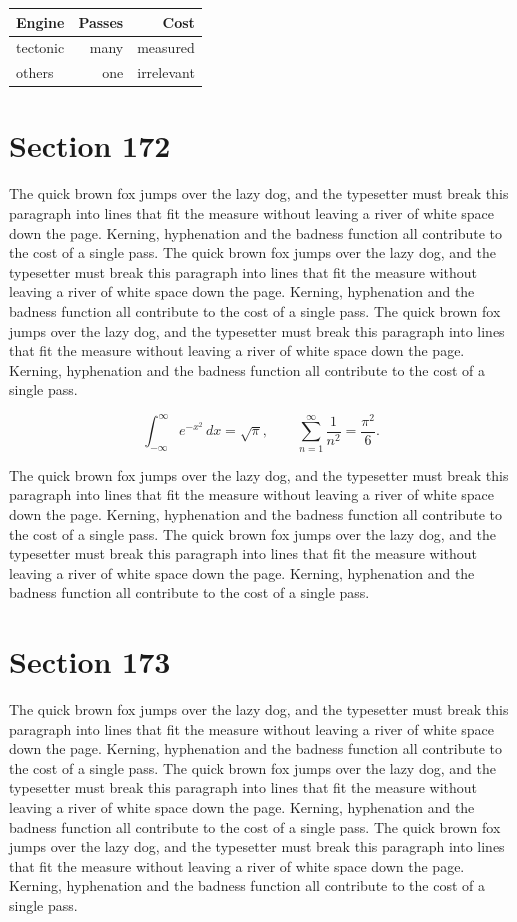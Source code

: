 \documentclass{article}
\begin{document}
\begin{center}
\begin{tabular}{lrr}
\toprule
Engine & Passes & Cost \\
\midrule
tectonic & many & measured \\
others & one & irrelevant \\
\bottomrule
\end{tabular}
\end{center}

\section{Section 172}
The quick brown fox jumps over the lazy dog, and the typesetter must break this paragraph into lines that fit the measure without leaving a river of white space down the page. Kerning, hyphenation and the badness function all contribute to the cost of a single pass. The quick brown fox jumps over the lazy dog, and the typesetter must break this paragraph into lines that fit the measure without leaving a river of white space down the page. Kerning, hyphenation and the badness function all contribute to the cost of a single pass. The quick brown fox jumps over the lazy dog, and the typesetter must break this paragraph into lines that fit the measure without leaving a river of white space down the page. Kerning, hyphenation and the badness function all contribute to the cost of a single pass. 

\begin{equation}
\int_{-\infty}^{\infty} e^{-x^{2}}\,dx = \sqrt{\pi}, \qquad
\sum_{n=1}^{\infty} \frac{1}{n^{2}} = \frac{\pi^{2}}{6}.
\end{equation}

The quick brown fox jumps over the lazy dog, and the typesetter must break this paragraph into lines that fit the measure without leaving a river of white space down the page. Kerning, hyphenation and the badness function all contribute to the cost of a single pass. The quick brown fox jumps over the lazy dog, and the typesetter must break this paragraph into lines that fit the measure without leaving a river of white space down the page. Kerning, hyphenation and the badness function all contribute to the cost of a single pass. 
\section{Section 173}
The quick brown fox jumps over the lazy dog, and the typesetter must break this paragraph into lines that fit the measure without leaving a river of white space down the page. Kerning, hyphenation and the badness function all contribute to the cost of a single pass. The quick brown fox jumps over the lazy dog, and the typesetter must break this paragraph into lines that fit the measure without leaving a river of white space down the page. Kerning, hyphenation and the badness function all contribute to the cost of a single pass. The quick brown fox jumps over the lazy dog, and the typesetter must break this paragraph into lines that fit the measure without leaving a river of white space down the page. Kerning, hyphenation and the badness function all contribute to the cost of a single pass. 
\end{document}
